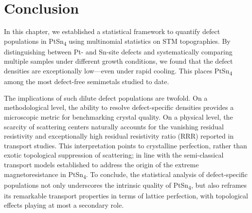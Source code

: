 \section{Conclusion}
In this chapter, we established a statistical framework to quantify defect populations in PtSn\textsubscript{4} using multinomial statistics on STM topographies. By distinguishing between Pt- and Sn-site defects and systematically comparing multiple samples under different growth conditions, we found that the defect densities are exceptionally low—even under rapid cooling. This places PtSn\textsubscript{4} among the most defect-free semimetals studied to date.

The implications of such dilute defect populations are twofold. On a methodological level, the ability to resolve defect-specific densities provides a microscopic metric for benchmarking crystal quality. On a physical level, the scarcity of scattering centers naturally accounts for the vanishing residual resistivity and exceptionally high residual resistivity ratio (RRR) reported in transport studies. This interpretation points to crystalline perfection, rather than exotic topological suppression of scattering; in line with the semi-classical transport models established to address the origin of the extreme magnetoresistance in PtSn\textsubscript{4}\cite{diazSemiclassicalOriginExtreme2024}. To conclude, the statistical analysis of defect-specific populations not only underscores the intrinsic quality of PtSn\textsubscript{4}, but also reframes its remarkable transport properties in terms of lattice perfection, with topological effects playing at most a secondary role. 